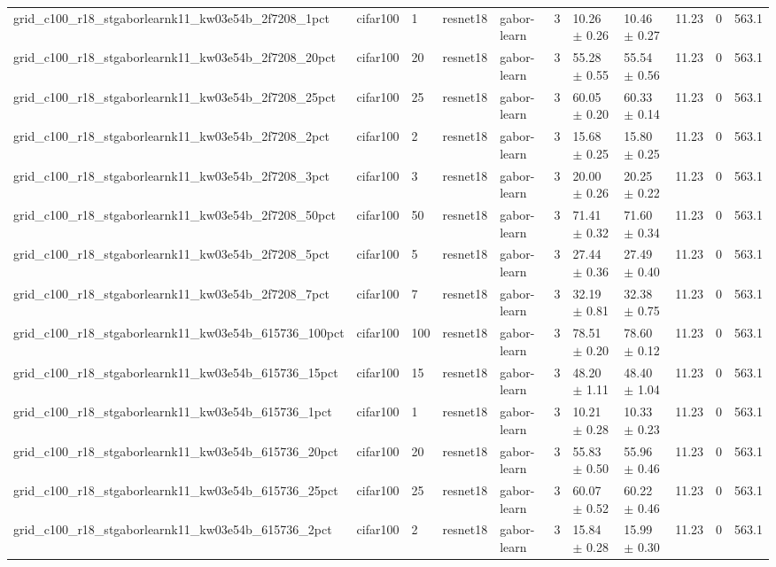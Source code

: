 \begin{tabular}{lllllllllll}
grid_c100_r18_stgaborlearnk11_kw03e54b_2f7208_1pct & cifar100 & 1 & resnet18 & gabor-learn & 3 & 10.26 $\pm$ 0.26 & 10.46 $\pm$ 0.27 & 11.23 & 0 & 563.1 \\
grid_c100_r18_stgaborlearnk11_kw03e54b_2f7208_20pct & cifar100 & 20 & resnet18 & gabor-learn & 3 & 55.28 $\pm$ 0.55 & 55.54 $\pm$ 0.56 & 11.23 & 0 & 563.1 \\
grid_c100_r18_stgaborlearnk11_kw03e54b_2f7208_25pct & cifar100 & 25 & resnet18 & gabor-learn & 3 & 60.05 $\pm$ 0.20 & 60.33 $\pm$ 0.14 & 11.23 & 0 & 563.1 \\
grid_c100_r18_stgaborlearnk11_kw03e54b_2f7208_2pct & cifar100 & 2 & resnet18 & gabor-learn & 3 & 15.68 $\pm$ 0.25 & 15.80 $\pm$ 0.25 & 11.23 & 0 & 563.1 \\
grid_c100_r18_stgaborlearnk11_kw03e54b_2f7208_3pct & cifar100 & 3 & resnet18 & gabor-learn & 3 & 20.00 $\pm$ 0.26 & 20.25 $\pm$ 0.22 & 11.23 & 0 & 563.1 \\
grid_c100_r18_stgaborlearnk11_kw03e54b_2f7208_50pct & cifar100 & 50 & resnet18 & gabor-learn & 3 & 71.41 $\pm$ 0.32 & 71.60 $\pm$ 0.34 & 11.23 & 0 & 563.1 \\
grid_c100_r18_stgaborlearnk11_kw03e54b_2f7208_5pct & cifar100 & 5 & resnet18 & gabor-learn & 3 & 27.44 $\pm$ 0.36 & 27.49 $\pm$ 0.40 & 11.23 & 0 & 563.1 \\
grid_c100_r18_stgaborlearnk11_kw03e54b_2f7208_7pct & cifar100 & 7 & resnet18 & gabor-learn & 3 & 32.19 $\pm$ 0.81 & 32.38 $\pm$ 0.75 & 11.23 & 0 & 563.1 \\
grid_c100_r18_stgaborlearnk11_kw03e54b_615736_100pct & cifar100 & 100 & resnet18 & gabor-learn & 3 & 78.51 $\pm$ 0.20 & 78.60 $\pm$ 0.12 & 11.23 & 0 & 563.1 \\
grid_c100_r18_stgaborlearnk11_kw03e54b_615736_15pct & cifar100 & 15 & resnet18 & gabor-learn & 3 & 48.20 $\pm$ 1.11 & 48.40 $\pm$ 1.04 & 11.23 & 0 & 563.1 \\
grid_c100_r18_stgaborlearnk11_kw03e54b_615736_1pct & cifar100 & 1 & resnet18 & gabor-learn & 3 & 10.21 $\pm$ 0.28 & 10.33 $\pm$ 0.23 & 11.23 & 0 & 563.1 \\
grid_c100_r18_stgaborlearnk11_kw03e54b_615736_20pct & cifar100 & 20 & resnet18 & gabor-learn & 3 & 55.83 $\pm$ 0.50 & 55.96 $\pm$ 0.46 & 11.23 & 0 & 563.1 \\
grid_c100_r18_stgaborlearnk11_kw03e54b_615736_25pct & cifar100 & 25 & resnet18 & gabor-learn & 3 & 60.07 $\pm$ 0.52 & 60.22 $\pm$ 0.46 & 11.23 & 0 & 563.1 \\
grid_c100_r18_stgaborlearnk11_kw03e54b_615736_2pct & cifar100 & 2 & resnet18 & gabor-learn & 3 & 15.84 $\pm$ 0.28 & 15.99 $\pm$ 0.30 & 11.23 & 0 & 563.1 \\

\end{tabular}
